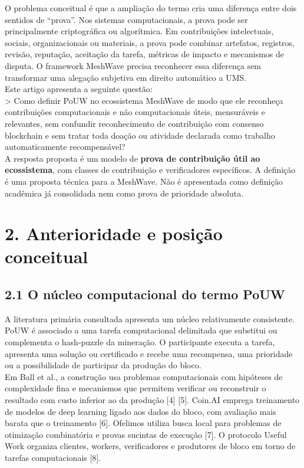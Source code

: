 \documentclass[12pt,a4paper]{article}
\begin{document}
O problema conceitual é que a ampliação do termo cria uma diferença entre dois sentidos de “prova”. Nos sistemas computacionais, a prova pode ser principalmente criptográfica ou algorítmica. Em contribuições intelectuais, sociais, organizacionais ou materiais, a prova pode combinar artefatos, registros, revisão, reputação, aceitação da tarefa, métricas de impacto e mecanismos de disputa. O framework MeshWave precisa reconhecer essa diferença sem transformar uma alegação subjetiva em direito automático a UMS.\\

Este artigo apresenta a seguinte questão:\\

> Como definir PoUW no ecossistema MeshWave de modo que ele reconheça contribuições computacionais e não computacionais úteis, mensuráveis e relevantes, sem confundir reconhecimento de contribuição com consenso blockchain e sem tratar toda doação ou atividade declarada como trabalho automaticamente recompensável?\\

A resposta proposta é um modelo de \textbf{prova de contribuição útil ao ecossistema}, com classes de contribuição e verificadores específicos. A definição é uma proposta técnica para a MeshWave. Não é apresentada como definição acadêmica já consolidada nem como prova de prioridade absoluta.\\


\section{2. Anterioridade e posição conceitual}

\subsection{2.1 O núcleo computacional do termo PoUW}

A literatura primária consultada apresenta um núcleo relativamente consistente. PoUW é associado a uma tarefa computacional delimitada que substitui ou complementa o hash-puzzle da mineração. O participante executa a tarefa, apresenta uma solução ou certificado e recebe uma recompensa, uma prioridade ou a possibilidade de participar da produção do bloco.\\

Em Ball et al., a construção usa problemas computacionais com hipóteses de complexidade fina e mecanismos que permitem verificar ou reconstruir o resultado com custo inferior ao da produção [4] [5]. Coin.AI emprega treinamento de modelos de deep learning ligado aos dados do bloco, com avaliação mais barata que o treinamento [6]. Ofelimos utiliza busca local para problemas de otimização combinatória e provas sucintas de execução [7]. O protocolo Useful Work organiza clientes, workers, verificadores e produtores de bloco em torno de tarefas computacionais [8].\\
\end{document}

